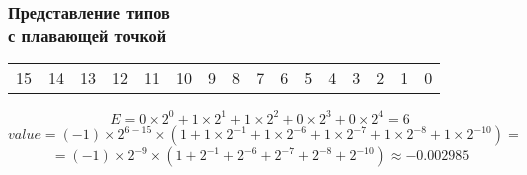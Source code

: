 \documentclass[compress, 8pt]{beamer}
\newenvironment{sixteenbit}{%
    \begin{center}
        \begin{tabular}{ |m{0.2cm}|m{0.2cm}|m{0.2cm}|m{0.2cm}|m{0.2cm}|m{0.2cm}|m{0.2cm}|m{0.2cm}|m{0.2cm}|m{0.2cm}|m{0.2cm}|m{0.2cm}|m{0.2cm}|m{0.2cm}|m{0.2cm}|m{0.2cm}|  }
            \hline
}{
        \hline
        \multicolumn{1}{c}{\color{gray}\tiny{15}} &
        \multicolumn{1}{c}{\color{gray}\tiny{14}} &
        \multicolumn{1}{c}{\color{gray}\tiny{13}} &
        \multicolumn{1}{c}{\color{gray}\tiny{12}} &
        \multicolumn{1}{c}{\color{gray}\tiny{11}} &
        \multicolumn{1}{c}{\color{gray}\tiny{10}} &
        \multicolumn{1}{c}{\color{gray}\tiny{9}} &
        \multicolumn{1}{c}{\color{gray}\tiny{8}} &
        \multicolumn{1}{c}{\color{gray}\tiny{7}} &
        \multicolumn{1}{c}{\color{gray}\tiny{6}} &
        \multicolumn{1}{c}{\color{gray}\tiny{5}} &
        \multicolumn{1}{c}{\color{gray}\tiny{4}} &
        \multicolumn{1}{c}{\color{gray}\tiny{3}} &
        \multicolumn{1}{c}{\color{gray}\tiny{2}} &
        \multicolumn{1}{c}{\color{gray}\tiny{1}} &
        \multicolumn{1}{c}{\color{gray}\tiny{0}} \\
        \end{tabular}
    \end{center}
}
\begin{document}
\begin{frame}[fragile]

    \frametitle{Представление типов \\ с плавающей точкой}

    \begin{sixteenbit}
        \cellcolor{blue!40!white}{1} &
        \cellcolor{green!40!white}{0} &
        \cellcolor{green!40!white}{0} &
        \cellcolor{green!40!white}{1} &
        \cellcolor{green!40!white}{1} &
        \cellcolor{green!40!white}{0} &
        \cellcolor{red!40!white}{1} &
        \cellcolor{red!40!white}{0} &
        \cellcolor{red!40!white}{0} &
        \cellcolor{red!40!white}{0} &
        \cellcolor{red!40!white}{0} &
        \cellcolor{red!40!white}{1} &
        \cellcolor{red!40!white}{1} &
        \cellcolor{red!40!white}{1} &
        \cellcolor{red!40!white}{0} &
        \cellcolor{red!40!white}{1} \\
    \end{sixteenbit}

    \begin{displaymath}
        E =
            0 \times 2^0 +
            1 \times 2^1 +
            1 \times 2^2 +
            0 \times 2^3 +
            0 \times 2^4 =
            6
    \end{displaymath}
    \begin{displaymath}
        value = (-1) \times 2^{6-15} \times (
            1 +
            1 \times 2^{-1} +
            1 \times 2^{-6} +
            1 \times 2^{-7} +
            1 \times 2^{-8} +
            1 \times 2^{-10}
        ) =
    \end{displaymath}
    \begin{displaymath}
        = (-1) \times 2^{-9} \times (
            1 +
            2^{-1} +
            2^{-6} +
            2^{-7} +
            2^{-8} +
            2^{-10}
        ) \approx -0.002985
    \end{displaymath}

\end{frame}
\end{document}
